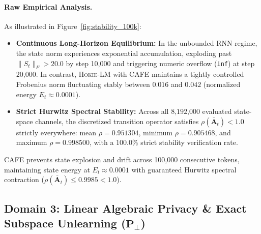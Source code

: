 \paragraph{Raw Empirical Analysis.}
As illustrated in Figure~\ref{fig:stability_100k}:
\begin{itemize}[leftmargin=*]
    \item \textbf{Continuous Long-Horizon Equilibrium:} In the unbounded RNN regime, the state norm experiences exponential accumulation, exploding past $\|S_t\|_F > 20.0$ by step 10,000 and triggering numeric overflow (\texttt{inf}) at step 20,000. In contrast, \textsc{Hokie-LM} with CAFE maintains a tightly controlled Frobenius norm fluctuating stably between $0.016$ and $0.042$ (normalized energy $E_t \approx 0.0001$).
    \item \textbf{Strict Hurwitz Spectral Stability:} Across all $8\text{,}192\text{,}000$ evaluated state-space channels, the discretized transition operator satisfies $\rho(\bar{\mathbf{A}}_t) < 1.0$ strictly everywhere: mean $\rho = 0.951304$, minimum $\rho = 0.905468$, and maximum $\rho = 0.998500$, with a 100.0\% strict stability verification rate.
\end{itemize}

\begin{takeawaybox}
CAFE prevents state explosion and drift across 100,000 consecutive tokens, maintaining state energy at $E_t \approx 0.0001$ with guaranteed Hurwitz spectral contraction ($\rho(\bar{\mathbf{A}}_t) \le 0.9985 < 1.0$).
\end{takeawaybox}

\subsection{Domain 3: Linear Algebraic Privacy \& Exact Subspace Unlearning ($\mathbf{P}_\perp$)}
\label{sec:exp_unlearning_killer}

